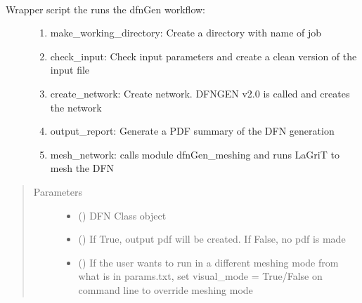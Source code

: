 \documentclass[letterpaper,10pt,english]{sphinxmanual}
\begin{document}
\begin{fulllineitems}
\label{\detokenize{pydfnworks:pydfnworks.dfnGen.generator.dfn_gen}}~\begin{description}
\item[{Wrapper script the runs the dfnGen workflow:}] \leavevmode\begin{enumerate}
\def\theenumi{\arabic{enumi}}
\def\labelenumi{\theenumi )}
\makeatletter\def\p@enumii{\p@enumi \theenumi )}\makeatother
\item {} 
make\_working\_directory: Create a directory with name of job

\item {} 
check\_input: Check input parameters and create a clean version of the input file

\item {} 
create\_network: Create network. DFNGEN v2.0 is called and creates the network

\item {} 
output\_report: Generate a PDF summary of the DFN generation

\item {} 
mesh\_network: calls module dfnGen\_meshing and runs LaGriT to mesh the DFN

\end{enumerate}

\end{description}
\begin{quote}\begin{description}
\item[{Parameters}] \leavevmode\begin{itemize}
\item {} 
 () \textendash{} DFN Class object

\item {} 
 () \textendash{} If True, output pdf will be created. If False, no pdf is made

\item {} 
 () \textendash{} If the user wants to run in a different meshing mode from what is in params.txt, set visual\_mode = True/False on command line to override meshing mode


\end{itemize}
\end{description}
\end{quote}
\end{fulllineitems}
\end{document}
